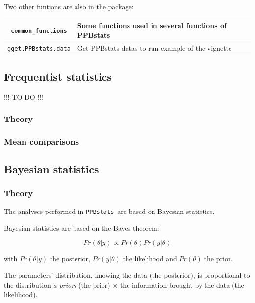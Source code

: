 \documentclass{book}\usepackage[]{graphicx}\usepackage[]{color}
\newcommand{\pack}{\texttt{PPBstats}}
\begin{document}
Two other funtions are also in the package:


\begin{table}[H]\begin{center}
\begin{tabular}{cl}
\hline
\texttt{common\_functions} & Some functions used in several functions of PPBstats \\ \hline
\texttt{gget.PPBstats.data} & Get PPBstats datas to run example of the vignette \\ \hline
\end{tabular}
\end{center}\end{table}



\subsection{Frequentist statistics}

!!! TO DO !!!

\subsubsection{Theory}

\subsubsection{Mean comparisons}

\subsection{Bayesian statistics}
\label{section_bayes}

\subsubsection{Theory}

The analyses performed in \pack~are based on Bayesian statistics.

Bayesian statistics are based on the Bayes theorem:

\begin{displaymath}
Pr(\theta|y) \propto Pr(\theta) Pr(y|\theta)
\end{displaymath}

with
$Pr(\theta|y)$ the posterior,
$Pr(y|\theta)$ the likelihood and
$Pr(\theta)$ the prior.

The parameters' distribution, knowing the data (the posterior), is proportional to the distribution \textit{a  priori} (the prior) $\times$ the information brought by the data (the likelihood).
\end{document}

